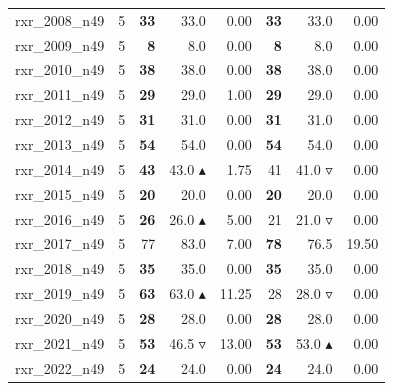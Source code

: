 \begin{table}[]
{\begin{tabular}{ll@{\hspace{1.2cm}}rrr@{\hspace{1.2cm}}rrr}
rxr_2008_n49 & 5 & \textbf{33} & 33.0 \phantom{$\blacktriangle$} & 0.00 & \textbf{33} & 33.0 \phantom{$\blacktriangle$} & 0.00 \\
rxr_2009_n49 & 5 & \textbf{8} & 8.0 \phantom{$\blacktriangle$} & 0.00 & \textbf{8} & 8.0 \phantom{$\blacktriangle$} & 0.00 \\
rxr_2010_n49 & 5 & \textbf{38} & 38.0 \phantom{$\blacktriangle$} & 0.00 & \textbf{38} & 38.0 \phantom{$\blacktriangle$} & 0.00 \\
rxr_2011_n49 & 5 & \textbf{29} & 29.0 \phantom{$\blacktriangle$} & 1.00 & \textbf{29} & 29.0 \phantom{$\blacktriangle$} & 0.00 \\
rxr_2012_n49 & 5 & \textbf{31} & 31.0 \phantom{$\blacktriangle$} & 0.00 & \textbf{31} & 31.0 \phantom{$\blacktriangle$} & 0.00 \\
rxr_2013_n49 & 5 & \textbf{54} & 54.0 \phantom{$\blacktriangle$} & 0.00 & \textbf{54} & 54.0 \phantom{$\blacktriangle$} & 0.00 \\
rxr_2014_n49 & 5 & \textbf{43} & 43.0 $\blacktriangle$ & 1.75 & 41 & 41.0 $\triangledown$ & 0.00 \\
rxr_2015_n49 & 5 & \textbf{20} & 20.0 \phantom{$\blacktriangle$} & 0.00 & \textbf{20} & 20.0 \phantom{$\blacktriangle$} & 0.00 \\
rxr_2016_n49 & 5 & \textbf{26} & 26.0 $\blacktriangle$ & 5.00 & 21 & 21.0 $\triangledown$ & 0.00 \\
rxr_2017_n49 & 5 & 77 & 83.0 \phantom{$\blacktriangle$} & 7.00 & \textbf{78} & 76.5 \phantom{$\blacktriangle$} & 19.50 \\
rxr_2018_n49 & 5 & \textbf{35} & 35.0 \phantom{$\blacktriangle$} & 0.00 & \textbf{35} & 35.0 \phantom{$\blacktriangle$} & 0.00 \\
rxr_2019_n49 & 5 & \textbf{63} & 63.0 $\blacktriangle$ & 11.25 & 28 & 28.0 $\triangledown$ & 0.00 \\
rxr_2020_n49 & 5 & \textbf{28} & 28.0 \phantom{$\blacktriangle$} & 0.00 & \textbf{28} & 28.0 \phantom{$\blacktriangle$} & 0.00 \\
rxr_2021_n49 & 5 & \textbf{53} & 46.5 $\triangledown$ & 13.00 & \textbf{53} & 53.0 $\blacktriangle$ & 0.00 \\
rxr_2022_n49 & 5 & \textbf{24} & 24.0 \phantom{$\blacktriangle$} & 0.00 & \textbf{24} & 24.0 \phantom{$\blacktriangle$} & 0.00 \\
\bottomrule
    \end{tabular}
    }
\end{table}
